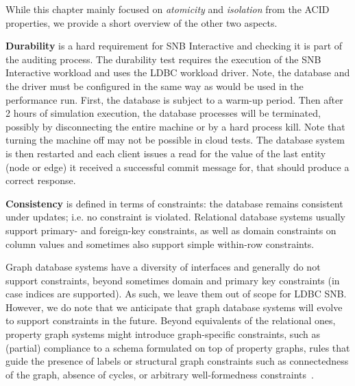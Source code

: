 While this chapter mainly focused on \emph{atomicity} and \emph{isolation} from the ACID properties, we provide a short overview of the other two aspects.

{\bf Durability} is a hard requirement for SNB Interactive and checking it is part of the 
auditing process. 
The durability test requires the execution of the SNB Interactive workload and uses the LDBC workload driver.
Note, the database and the driver must be configured in the same way as would be used in the performance run.
First, the database is subject to a warm-up period.
Then after 2 hours of simulation execution, the database processes will be terminated, possibly by disconnecting the entire machine or by a hard process kill.
Note that turning the machine off may not be possible in cloud tests.
The database system is then restarted and each client issues a read for the value of the last entity (node or edge) it received a successful commit message for, that should produce a correct response.


{\bf Consistency} is defined in terms of constraints: the database remains 
consistent under updates; i.e. no constraint is violated.
Relational database systems usually support primary- and foreign-key 
constraints, as well as domain constraints on column values and 
sometimes also support simple within-row constraints.

Graph database systems have a diversity of interfaces and generally do not
support constraints, beyond sometimes domain and primary key constraints 
(in case indices are supported).
As such, we leave them out of scope for LDBC SNB. 
However, we do note that we anticipate that graph database 
systems will evolve to support constraints in the future. 
Beyond equivalents of the relational ones, property graph systems 
might introduce graph-specific constraints, such as (partial) compliance to
a schema formulated on top of property graphs, rules that guide the 
presence of labels or structural graph constraints such as
connectedness of the graph, absence of cycles, %
or arbitrary well-formedness constraints~\cite{DBLP:journals/sosym/SemerathBHSV17}.
